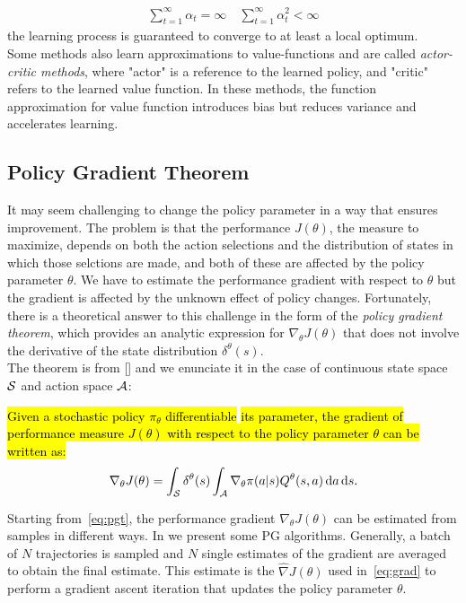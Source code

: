 \begin{align}\sum_{t=1}^{\infty}\alpha_t = \infty \quad \sum_{t=1}^{\infty}\alpha_t^2 < \infty\end{align} 
the learning process is guaranteed to converge to at least a local optimum.\\
\newline
Some methods also learn approximations to value-functions and are called \emph{actor-critic methods}, where "actor" is a reference to the learned policy, and "critic" refers to the learned value function. In these methods, the function approximation for value function introduces bias but reduces variance and accelerates learning.

\subsection{Policy Gradient Theorem} \label{subsec:pgt}
It may seem challenging to change the policy parameter in a way that ensures improvement. The problem is that the performance $J(\theta)$, \ie the measure to maximize, depends on both the action selections and the distribution of states in which those selctions are made, and both of these are affected by the policy parameter $\theta$. We have to estimate the performance gradient with respect to $\theta$ but the gradient is affected by the unknown effect of policy changes. Fortunately, there is a theoretical answer to this challenge in the form of the \emph{policy gradient theorem}, which provides an analytic expression for $\nabla_{\theta}J(\theta)$ that does not involve the derivative of the state distribution $\delta^{\theta}(s)$.\\
\newline
The theorem is from [\cite{Sutton1999PolicyGM}] and we enunciate it in the case of continuous state space $\mathcal{S}$ and action space $\mathcal{A}$:
\begin{theorem}
	\hl{Given a stochastic policy $\pi_{\theta}$ differentiable} \wrt \hl{its parameter, the gradient of performance measure $J(\theta)$ with respect to the policy parameter $\theta$ can be written as:}
	\begin{align} 
	\nabla_{\theta}J(\theta) = \int_{\mathcal{S}} \delta^{\theta}(s) \int_{\mathcal{A}} \nabla_{\theta} \pi(a|s) Q^{\theta}(s,a) \,\mathrm{d} a \,\mathrm{d} s. \label{eq:pgt}
	\end{align}
\end{theorem}
\noindent Starting from~\eqref{eq:pgt}, the performance gradient $\nabla_{\theta}J(\theta)$ can be estimated from samples in different ways. In  we present some \ac{PG} algorithms. Generally, a batch of $N$ trajectories is sampled and $N$ single estimates of the gradient are averaged to obtain the final estimate. This estimate is the $\widehat{\nabla }J(\theta)$ used in~\eqref{eq:grad} to perform a gradient ascent iteration that updates the policy parameter $\theta$.


